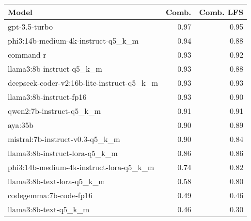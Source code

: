 \begin{tabular}{lrr}
\toprule
Model & Comb. & Comb. LFS \\
\midrule
gpt-3.5-turbo & 0.97 & 0.95 \\
phi3:14b-medium-4k-instruct-q5\_k\_m & 0.94 & 0.88 \\
command-r & 0.93 & 0.92 \\
llama3:8b-instruct-q5\_k\_m & 0.93 & 0.88 \\
deepseek-coder-v2:16b-lite-instruct-q5\_k\_m & 0.93 & 0.93 \\
llama3:8b-instruct-fp16 & 0.93 & 0.90 \\
qwen2:7b-instruct-q5\_k\_m & 0.91 & 0.91 \\
aya:35b & 0.90 & 0.89 \\
mistral:7b-instruct-v0.3-q5\_k\_m & 0.90 & 0.84 \\
llama3:8b-instruct-lora-q5\_k\_m & 0.86 & 0.86 \\
phi3:14b-medium-4k-instruct-lora-q5\_k\_m & 0.74 & 0.82 \\
llama3:8b-text-lora-q5\_k\_m & 0.58 & 0.80 \\
codegemma:7b-code-fp16 & 0.49 & 0.46 \\
llama3:8b-text-q5\_k\_m & 0.46 & 0.30 \\
\bottomrule
\end{tabular}
